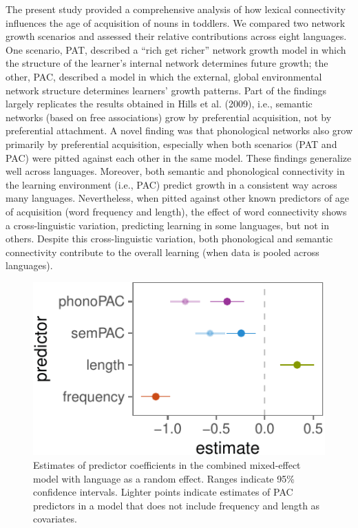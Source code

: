 \documentclass[10pt, letterpaper]{article}
\newenvironment{CodeChunk}{}{}
\begin{document}
The present study provided a comprehensive analysis of how lexical
connectivity influences the age of acquisition of nouns in toddlers. We
compared two network growth scenarios and assessed their relative
contributions across eight languages. One scenario, PAT, described a
``rich get richer'' network growth model in which the structure of the
learner's internal network determines future growth; the other, PAC,
described a model in which the external, global environmental network
structure determines learners' growth patterns. Part of the findings
largely replicates the results obtained in Hills et al. (2009), i.e.,
semantic networks (based on free associations) grow by preferential
acquisition, not by preferential attachment. A novel finding was that
phonological networks also grow primarily by preferential acquisition,
especially when both scenarios (PAT and PAC) were pitted against each
other in the same model. These findings generalize well across
languages. Moreover, both semantic and phonological connectivity in the
learning environment (i.e., PAC) predict growth in a consistent way
across many languages. Nevertheless, when pitted against other known
predictors of age of acquisition (word frequency and length), the effect
of word connectivity shows a cross-linguistic variation, predicting
learning in some languages, but not in others. Despite this
cross-linguistic variation, both phonological and semantic connectivity
contribute to the overall learning (when data is pooled across
languages).

\begin{CodeChunk}
\begin{figure}[H]

{\centering \includegraphics{figs/regressions_all_img-1} 

}

\caption{\label{fig:regressions_all_img}Estimates of predictor coefficients in the combined mixed-effect model with language as a random effect. Ranges indicate 95\% confidence intervals. Lighter points indicate estimates of PAC predictors in a model that does not include frequency and length as covariates.}\label{fig:regressions_all_img}
\end{figure}
\end{CodeChunk}
\end{document}
